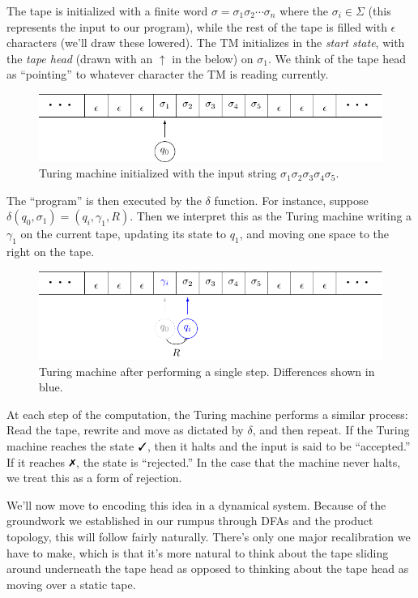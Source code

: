 \documentclass{fkpaper}
\begin{document}
\begin{multicols}{2}
The tape is initialized with a finite word $\sigma = \sigma_1 \sigma_2
\cdots \sigma_n$ where the $\sigma_i \in \Sigma$ (this represents the
input to our program), while the rest of the tape is filled with
$\epsilon$ characters (we'll draw these lowered). The TM initializes
in the \emph{start state}, with the \emph{tape head} (drawn with an
$\uparrow$ in the below) on $\sigma_1$. We think of the tape head as
``pointing'' to whatever character the TM is reading currently.
\begin{figure}[H]
  \centering
  \includegraphics[scale=.7]{figures/tm-initial-input.pdf}
  \caption{Turing machine initialized with the input string $\sigma_1
    \sigma_2 \sigma_3 \sigma_4 \sigma_5$.}
\end{figure}
The ``program'' is then executed by the $\delta$ function. For
instance, suppose $\delta(q_0, \sigma_1) = (q_i, \gamma_1, R)$. Then
we interpret this as the Turing machine writing a $\gamma_1$ on the
current tape, updating its state to $q_1$, and moving one space to the
right on the tape.
\begin{figure}[H]
  \centering
  \includegraphics[scale=.7]{figures/tm-one-step-later.pdf}
  \caption{Turing machine after performing a single step. Differences
    shown in {\color{blue} blue}.}
\end{figure}
At each step of the computation, the Turing machine performs a similar
process: Read the tape, rewrite and move as dictated by $\delta$, and
then repeat. If the Turing machine reaches the state $\cmark$, then it
halts and the input is said to be ``accepted.'' If it reaches
$\xmark$, the state is ``rejected.'' In the case that the machine
never halts, we treat this as a form of rejection.

We'll now move to encoding this idea in a dynamical system. Because of
the groundwork we established in our rumpus through DFAs and the
product topology, this will follow fairly naturally. There's only one
major recalibration we have to make, which is that it's more natural
to think about the tape sliding around underneath the tape head as
opposed to thinking about the tape head as moving over a static tape.


\end{multicols}
\end{document}
